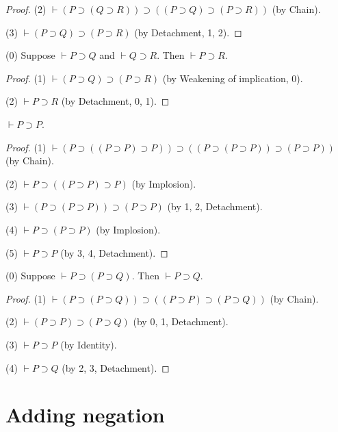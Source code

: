 \documentclass{stex}
\newcommand{\imp}{\supset}
\newcommand{\deducible}{\vdash}
\begin{document}
\begin{forthel}
\begin{proof}
    (2) $\deducible (P\imp (Q\imp R))\imp ((P\imp Q)\imp (P\imp R))$ (by Chain).

    (3) $\deducible (P\imp Q)\imp (P\imp R)$ (by Detachment, 1, 2).
\end{proof}

\begin{proposition}[Transitivity]
    (0) Suppose $\deducible P\imp Q$ and $\deducible Q\imp R$.
    Then $\deducible P\imp R$.
\end{proposition}
\begin{proof}
    (1) $\deducible (P\imp Q)\imp (P\imp R)$ (by Weakening of implication, 0).

    (2) $\deducible P\imp R$  (by Detachment, 0, 1).
\end{proof}

\begin{proposition}[Identity]
    $\deducible P\imp P$.
\end{proposition}
\begin{proof}
    (1) $\deducible (P\imp ((P\imp P)\imp P))\imp ((P\imp (P\imp P))\imp (P\imp P))$ (by Chain).

    (2) $\deducible P\imp ((P\imp P)\imp P)$ (by Implosion).

    (3) $\deducible (P\imp (P\imp P))\imp (P\imp P)$ (by 1, 2, Detachment).

    (4) $\deducible P\imp (P\imp P)$ (by Implosion).

    (5) $\deducible P\imp P$ (by 3, 4, Detachment).
\end{proof}

\begin{proposition}
    (0) Suppose $\deducible P\imp (P\imp Q)$.
    Then $\deducible P\imp Q$.
\end{proposition}
\begin{proof}
    (1) $\deducible (P\imp (P\imp Q))\imp ((P\imp P)\imp (P\imp Q))$ (by Chain).

    (2) $\deducible (P\imp P)\imp (P\imp Q)$ (by 0, 1, Detachment).

    (3) $\deducible P\imp P$  (by Identity).

    (4) $\deducible P\imp Q$  (by 2, 3, Detachment).
\end{proof}
\end{forthel}

\section{Adding negation}
\end{document}

